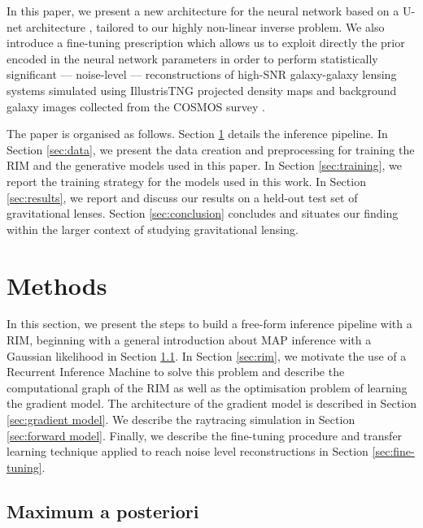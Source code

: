 In this paper, we present a new architecture for the neural network based on a U-net architecture \citep{Ronneberger2015}, tailored to our highly non-linear inverse problem. We also introduce a fine-tuning prescription which allows us to exploit directly the prior encoded in the neural network parameters in order to perform statistically significant --- noise-level --- reconstructions of high-SNR galaxy-galaxy lensing systems simulated using IllustrisTNG \citep{Nelson2018} projected density maps and background galaxy images collected from the COSMOS survey \citep{Koekemoer2007,Scoville2007}.

The paper is organised as follows. Section \ref{sec:methods} details 
the inference pipeline. In Section \ref{sec:data}, we present the 
data creation and preprocessing for training the RIM and the generative models 
used in this paper. In Section \ref{sec:training}, 
we report the training strategy for the models used in this work. 
In Section \ref{sec:results}, 
we report and discuss our results on a held-out test set of gravitational lenses. Section 
\ref{sec:conclusion} concludes and situates our finding within the larger context of 
studying gravitational lensing.


\section{Methods}\label{sec:methods}
In this section, we present the steps to build a free-form inference pipeline 
with a RIM, beginning with a general introduction about MAP inference 
with a Gaussian likelihood in Section \ref{sec:maximum a posteriori}. 
In Section \ref{sec:rim}, we motivate the use of a Recurrent Inference Machine 
to solve this problem and describe the computational graph of the RIM as 
well as the optimisation problem of learning the gradient model. 
The architecture of the gradient model is described in Section 
\ref{sec:gradient model}. We describe the raytracing simulation 
in Section \ref{sec:forward model}. Finally, 
we describe the fine-tuning procedure and transfer learning technique 
applied to reach noise level reconstructions in Section \ref{sec:fine-tuning}.



\subsection{Maximum a posteriori}\label{sec:maximum a posteriori}


